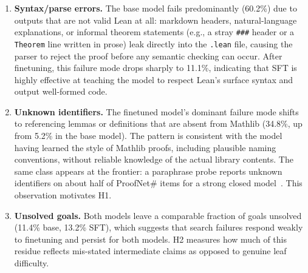 \documentclass[sigconf,anonymous]{aamas}
\begin{document}
\begin{enumerate}
    \item \textbf{Syntax/parse errors.} The base model fails predominantly (60.2\%) due to outputs that are not valid Lean at all: markdown headers, natural-language explanations, or informal theorem statements (e.g., a stray \texttt{\#\#\#} header or a \texttt{Theorem} line written in prose) leak directly into the \texttt{.lean} file, causing the parser to reject the proof before any semantic checking can occur. After finetuning, this failure mode drops sharply to 11.1\%, indicating that SFT is highly effective at teaching the model to respect Lean's surface syntax and output well-formed code.
    \item \textbf{Unknown identifiers.} The finetuned model's dominant failure
    mode shifts to referencing lemmas or definitions that are absent from
    Mathlib (34.8\%, up from 5.2\% in the base model). The pattern is consistent
    with the model having learned the style of Mathlib proofs, including
    plausible naming conventions, without reliable knowledge of the actual
    library contents. The same class appears at the frontier: a paraphrase probe
    reports unknown identifiers on about half of ProofNet\# items for a strong
    closed model~\citep{surfacesens2026}. This observation motivates H1.
    \item \textbf{Unsolved goals.} Both models leave a comparable fraction of
    goals unsolved (11.4\% base, 13.2\% SFT), which suggests that search
    failures respond weakly to finetuning and persist for both models. H2
    measures how much of this residue reflects mis-stated intermediate claims as
    opposed to genuine leaf difficulty.
\end{enumerate}
\end{document}
